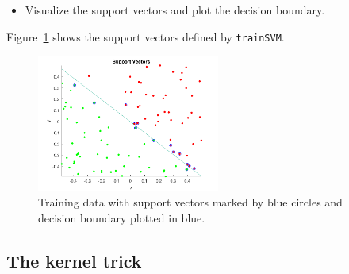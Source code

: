 \documentclass[a4]{article}
\begin{document}
\begin{itemize}
\item Visualize the support vectors and plot the decision boundary.
\end{itemize}
Figure~\ref{fig:sv} shows the support vectors defined by \texttt{trainSVM}.
\begin{figure}[!h]
	\begin{center}
		\centering
		\includegraphics[width=6cm]{../figures/sv.pdf}
	\end{center}
	\caption{Training data with support vectors marked by blue circles and decision boundary plotted in blue.}
	\label{fig:sv}
\end{figure}


\subsection{The kernel trick}
\end{document}
